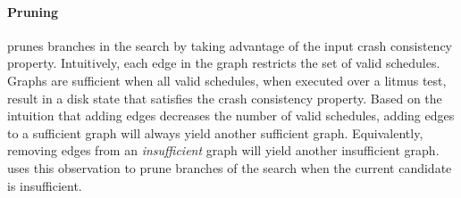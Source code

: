 %
%
%

\paragraph{Pruning}
\sccsearch prunes branches in the search by taking advantage of the input crash consistency property.
Intuitively, each edge in the graph restricts the set of valid schedules.
Graphs are sufficient when all valid schedules, when executed over a litmus test, 
result in a disk state that satisfies the crash consistency property.
Based on the intuition that adding edges decreases the number of valid schedules,
adding edges to a sufficient graph will always yield another sufficient graph.
Equivalently, removing edges from an \textit{insufficient} graph will 
yield another insufficient graph.
\sccsearch uses this observation to prune branches of the search when the current candidate is insufficient.

